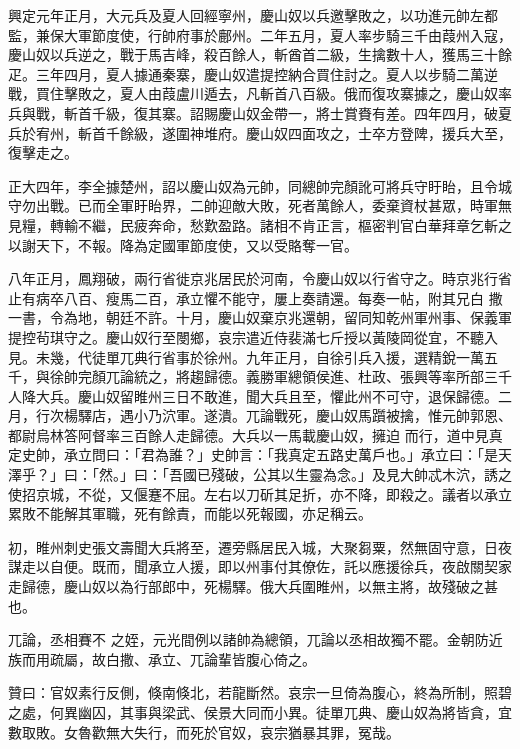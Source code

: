 \begin{pinyinscope}
 興定元年正月，大元兵及夏人回經寧州，慶山奴以兵邀擊敗之，以功進元帥左都監，兼保大軍節度使，行帥府事於鄜州。二年五月，夏人率步騎三千由葭州入寇，慶山奴以兵逆之，戰于馬吉峰，殺百餘人，斬酋首二級，生擒數十人，獲馬三十餘疋。三年四月，夏人據通秦寨，慶山奴遣提控納合買住討之。夏人以步騎二萬逆戰，買住擊敗之，夏人由葭盧川遁去，凡斬首八百級。俄而復攻寨據之，慶山奴率兵與戰，斬首千級，復其寨。詔賜慶山奴金帶一，將士賞賚有差。四年四月，破夏
 兵於宥州，斬首千餘級，遂圍神堆府。慶山奴四面攻之，士卒方登陴，援兵大至，復擊走之。



 正大四年，李全據楚州，詔以慶山奴為元帥，同總帥完顏訛可將兵守盱眙，且令城守勿出戰。已而全軍盱眙界，二帥迎敵大敗，死者萬餘人，委棄資杖甚眾，時軍無見糧，轉輸不繼，民疲奔命，愁歎盈路。諸相不肯正言，樞密判官白華拜章乞斬之以謝天下，不報。降為定國軍節度使，又以受賂奪一官。



 八年正月，鳳翔破，兩行省徙京兆居民於河南，令慶山奴以行省守之。時京兆行省止有病卒八百、瘦馬二百，承立懼不能守，屢上奏請還。每奏一帖，附其兄白
 撒一書，令為地，朝廷不許。十月，慶山奴棄京兆還朝，留同知乾州軍州事、保義軍提控茍琪守之。慶山奴行至閿鄉，哀宗遣近侍裴滿七斤授以黃陵岡從宜，不聽入見。未幾，代徒單兀典行省事於徐州。九年正月，自徐引兵入援，選精銳一萬五千，與徐帥完顏兀論統之，將趨歸德。義勝軍總領侯進、杜政、張興等率所部三千人降大兵。慶山奴留睢州三日不敢進，聞大兵且至，懼此州不可守，退保歸德。二月，行次楊驛店，遇小乃泬軍。遂潰。兀論戰死，慶山奴馬躓被擒，惟元帥郭恩、都尉烏林答阿督率三百餘人走歸德。大兵以一馬載慶山奴，擁迫
 而行，道中見真定史帥，承立問曰：「君為誰？」史帥言：「我真定五路史萬戶也。」承立曰：「是天澤乎？」曰：「然。」曰：「吾國已殘破，公其以生靈為念。」及見大帥忒木泬，誘之使招京城，不從，又偃蹇不屈。左右以刀斫其足折，亦不降，即殺之。議者以承立累敗不能解其軍職，死有餘責，而能以死報國，亦足稱云。



 初，睢州刺史張文壽聞大兵將至，遷旁縣居民入城，大聚芻粟，然無固守意，日夜謀走以自便。既而，聞承立人援，即以州事付其僚佐，託以應援徐兵，夜啟關契家走歸德，慶山奴以為行部郎中，死楊驛。俄大兵圍睢州，以無主將，故殘破之甚也。



 兀論，丞相賽不
 之姪，元光間例以諸帥為總領，兀論以丞相故獨不罷。金朝防近族而用疏屬，故白撒、承立、兀論輩皆腹心倚之。



 贊曰：官奴素行反側，倏南倏北，若龍斷然。哀宗一旦倚為腹心，終為所制，照碧之處，何異幽囚，其事與梁武、侯景大同而小異。徒單兀典、慶山奴為將皆貪，宜數取敗。女魯歡無大失行，而死於官奴，哀宗猶暴其罪，冤哉。



\end{pinyinscope}